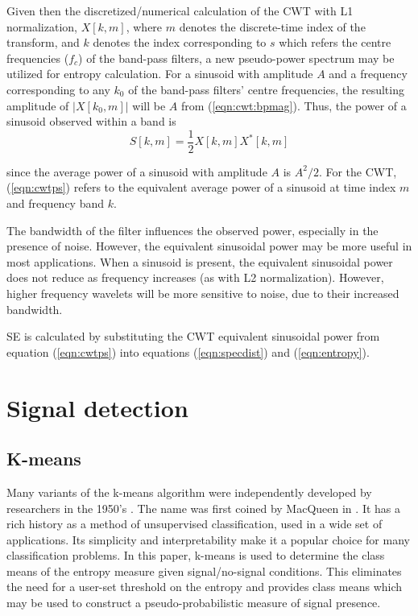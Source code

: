 Given then the discretized/numerical calculation of the CWT with L1 normalization, $X[k,m]$, where $m$ denotes the discrete-time index of the transform, and $k$ denotes the index corresponding to $s$ which refers the centre frequencies ($f_c$) of the band-pass filters, a new pseudo-power spectrum may be utilized for entropy calculation. For a sinusoid with amplitude $A$ and a frequency corresponding to any $k_0$ of the band-pass filters' centre frequencies, the resulting amplitude of $|X[k_0,m]|$ will be $A$ from (\ref{eqn:cwt:bpmag}). Thus, the power of a sinusoid observed within a band is
\begin{equation}
	\label{eqn:cwtps}
	S[k,m] = \frac{1}{2} X[k,m] X^*[k,m]
\end{equation}

\noindent since the average power of a sinusoid with amplitude $A$ is $A^2/2$. For the CWT, (\ref{eqn:cwtps}) refers to the equivalent average power of a sinusoid at time index $m$ and frequency band $k$.

The bandwidth of the filter influences the observed power, especially in the presence of noise. However, the equivalent sinusoidal power may be more useful in most applications. When a sinusoid is present, the equivalent sinusoidal power does not reduce as frequency increases (as with L2 normalization). However, higher frequency wavelets will be more sensitive to noise, due to their increased bandwidth.

SE is calculated by substituting the CWT equivalent sinusoidal power from equation (\ref{eqn:cwtps}) into equations (\ref{eqn:specdist}) and (\ref{eqn:entropy}).

\section{Signal detection}
\subsection{K-means}
Many variants of the k-means algorithm were independently developed by researchers in the 1950's \citep{kmeansoverview}. The name was first coined by MacQueen in \citep{kmeans}. It has a rich history as a method of unsupervised classification, used in a wide set of applications. Its simplicity and interpretability make it a popular choice for many classification problems.  In this paper, k-means is used to determine the class means of the entropy measure given signal/no-signal conditions. This eliminates the need for a user-set threshold on the entropy and provides class means which may be used to construct a pseudo-probabilistic measure of signal presence. 




